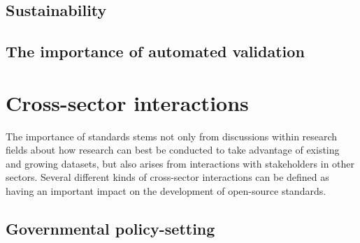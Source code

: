\documentclass[
  letterpaper,
  DIV=11,
  numbers=noendperiod]{scrartcl}
\begin{document}
\subsection{Sustainability}\label{sustainability}

\subsection{The importance of automated
validation}\label{the-importance-of-automated-validation}

\section{Cross-sector interactions}\label{sec-cross-sector}

The importance of standards stems not only from discussions within
research fields about how research can best be conducted to take
advantage of existing and growing datasets, but also arises from
interactions with stakeholders in other sectors. Several different kinds
of cross-sector interactions can be defined as having an important
impact on the development of open-source standards.

\subsection{Governmental
policy-setting}\label{governmental-policy-setting}
\end{document}
